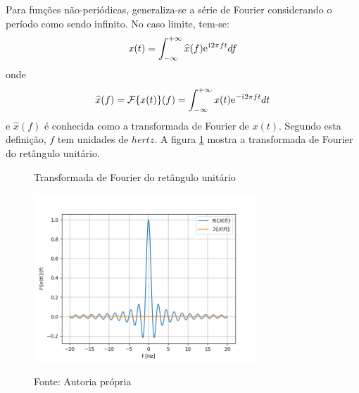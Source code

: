 \documentclass[12pt,a4paper]{report}
\newcommand{\I}{{\mathrm{i}\mkern1mu}}
\newcommand{\euler}{{\mathrm{e}\mkern1mu}}
\begin{document}
  Para funções não-periódicas, generaliza-se a série de Fourier considerando o período como sendo infinito.
  No caso limite, tem-se:
  \begin{equation}
    x(t) = \int_{-\infty}^{+\infty} \widehat{x}(f) \euler^{\I 2 \pi f t} df
  \end{equation}
  onde
  \begin{equation}
    \widehat{x}(f) = \mathcal{F}\{x(t)\}(f) = \int_{-\infty}^{+\infty} x(t) \euler^{-\I 2 \pi f t} dt
  \end{equation}
  e $\widehat{x}(f)$ é conhecida como a transformada de Fourier de $x(t)$. Segundo esta definição, $f$ tem
  unidades de $hertz$. A figura \ref{fig:fourier_transform} mostra a transformada de Fourier do retângulo
  unitário.
  \begin{figure}[H]
    \caption{Transformada de Fourier do retângulo unitário}
    \centering
    \includegraphics[width=0.75\textwidth]{fourier_transform}
    \label{fig:fourier_transform}
    \caption*{Fonte: Autoria própria}
  \end{figure}
\end{document}
